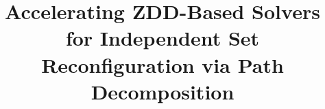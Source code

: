 \documentclass[conference]{IEEEtran}
\begin{document}

\title{Accelerating ZDD-Based Solvers for Independent Set Reconfiguration via Path Decomposition}

\author{
\IEEEauthorblockA{}
}

\end{document}
